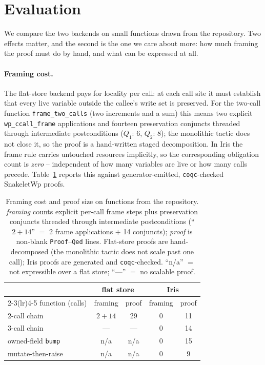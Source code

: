 \documentclass[sigconf,nonacm]{acmart}
\newcommand{\code}[1]{\texttt{#1}}
\begin{document}
\section{Evaluation}
\label{sec:eval}

We compare the two backends on small functions drawn from the repository. Two
effects matter, and the second is the one we care about more: how much framing
the proof must do by hand, and what can be expressed at all.

\paragraph{Framing cost.} The flat-store backend pays for locality per call: at
each call site it must establish that every live variable outside the callee's
write set is preserved. For the two-call function \code{frame\_two\_calls} (two
increments and a sum) this means two explicit \code{wp\_ccall\_frame}
applications and fourteen preservation conjuncts threaded through intermediate
postconditions ($Q_1$: 6, $Q_2$: 8); the monolithic tactic does not close it, so
the proof is a hand-written staged decomposition. In Iris the frame rule carries
untouched resources implicitly, so the corresponding obligation count is
\emph{zero} -- independent of how many variables are live or how many calls
precede. Table~\ref{tab:eval} reports this against generator-emitted,
\code{coqc}-checked SnakeletWp proofs.

\begin{table}[t]
\caption{Framing cost and proof size on functions from the repository.
\emph{framing} counts explicit per-call frame steps plus preservation conjuncts
threaded through intermediate postconditions (``$2{+}14$'' $=$ 2 frame
applications $+$ 14 conjuncts); \emph{proof} is non-blank \code{Proof}--\code{Qed}
lines. Flat-store proofs are hand-decomposed (the monolithic tactic does not
scale past one call); Iris proofs are generated and \code{coqc}-checked.
``n/a'' $=$ not expressible over a flat store; ``---'' $=$ no scalable proof.}
\label{tab:eval}
\small
\begin{tabular}{@{}lcccc@{}}
\toprule
 & \multicolumn{2}{c}{flat store} & \multicolumn{2}{c}{Iris} \\
\cmidrule(lr){2-3}\cmidrule(lr){4-5}
function (calls) & framing & proof & framing & proof \\
\midrule
2-call chain        & $2{+}14$ & 29  & 0 & 11 \\
3-call chain        & ---      & --- & 0 & 14 \\
owned-field \code{bump}   & n/a & n/a & 0 & 15 \\
mutate-then-raise   & n/a      & n/a & 0 & \phantom{0}9 \\
\bottomrule
\end{tabular}
\end{table}
\end{document}
